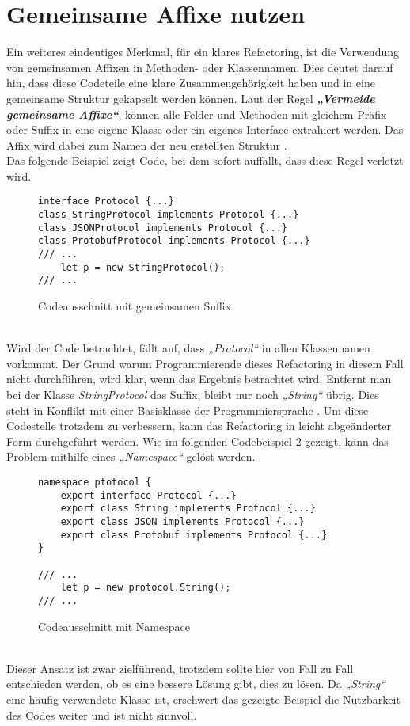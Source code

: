 \section{Gemeinsame Affixe nutzen}
Ein weiteres eindeutiges Merkmal, für ein klares Refactoring, ist die Verwendung von gemeinsamen Affixen in Methoden- oder Klassennamen.
Dies deutet darauf hin, dass diese Codeteile eine klare Zusammengehörigkeit haben und in eine gemeinsame Struktur gekapselt werden können.
Laut der Regel \textbf{\textit{„Vermeide gemeinsame Affixe“}}, können alle Felder und Methoden mit gleichem Präfix oder Suffix in eine eigene Klasse oder ein eigenes Interface extrahiert werden.
Das Affix wird dabei zum Namen der neu erstellten Struktur \citep[S. 201 ff.]{fiveLines.2023}.\\
Das folgende Beispiel zeigt Code, bei dem sofort auffällt, dass diese Regel verletzt wird. 
\begin{figure}[ht]
    \centering
        \begin{verbatim}
interface Protocol {...}
class StringProtocol implements Protocol {...}
class JSONProtocol implements Protocol {...}
class ProtobufProtocol implements Protocol {...}
/// ...
    let p = new StringProtocol();
/// ...
        \end{verbatim}
    \caption{Codeausschnitt mit gemeinsamen Suffix \citep[S. 331]{fiveLines.2023}}
    \label{fig:AffixeSchlecht}
\end{figure}\\
Wird der Code betrachtet, fällt auf, dass \textit{„Protocol“} in allen Klassennamen vorkommt.
Der Grund warum Programmierende dieses Refactoring in diesem Fall nicht durchführen, wird klar, wenn das Ergebnis betrachtet wird.
Entfernt man bei der Klasse \textit{StringProtocol} das Suffix, bleibt nur noch \textit{„String“} übrig.
Dies steht in Konflikt mit einer Basisklasse der Programmiersprache \citep[S. 330 f.]{fiveLines.2023}.
Um diese Codestelle trotzdem zu verbessern, kann das Refactoring in leicht abgeänderter Form durchgeführt werden.
Wie im folgenden Codebeispiel \ref{fig:AffixeGut} gezeigt, kann das Problem mithilfe eines \textit{„Namespace“} gelöst werden.
\begin{figure}[ht]
    \centering
        \begin{verbatim}
namespace ptotocol {
    export interface Protocol {...}
    export class String implements Protocol {...}
    export class JSON implements Protocol {...}
    export class Protobuf implements Protocol {...}
}

/// ...
    let p = new protocol.String();
/// ...
        \end{verbatim}
    \caption{Codeausschnitt mit Namespace \citep[S. 331]{fiveLines.2023}}
    \label{fig:AffixeGut}
\end{figure}\\
Dieser Ansatz ist zwar zielführend, trotzdem sollte hier von Fall zu Fall entschieden werden, ob es eine bessere Lösung gibt, dies zu lösen.
Da \textit{„String“} eine häufig verwendete Klasse ist, erschwert das gezeigte Beispiel die Nutzbarkeit des Codes weiter und ist nicht sinnvoll.

